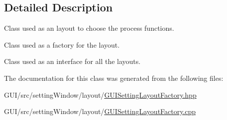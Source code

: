 \subsection{Detailed Description}
Class used as an layout to choose the process functions. 

Class used as a factory for the layout.

Class used as an interface for all the layouts. 

The documentation for this class was generated from the following files\+:\begin{DoxyCompactItemize}
\item 
G\+U\+I/src/setting\+Window/layout/\mbox{\hyperlink{_g_u_i_setting_layout_factory_8hpp}{G\+U\+I\+Setting\+Layout\+Factory.\+hpp}}\item 
G\+U\+I/src/setting\+Window/layout/\mbox{\hyperlink{_g_u_i_setting_layout_factory_8cpp}{G\+U\+I\+Setting\+Layout\+Factory.\+cpp}}\end{DoxyCompactItemize}
